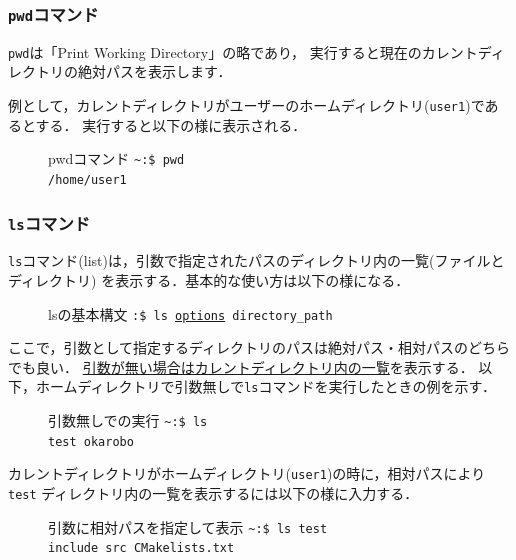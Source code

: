 \documentclass[autodetect-engine,dvi=dvipdfmx,ja=standard,a4j]{bxjsarticle}
\newcommand{\cmd}[1]{\textcolor{yellow!70!white} {#1}}
\newcommand{\dirpath}[1]{\textcolor{Cerulean}{#1}}
\newcommand{\prompt}[1]{\texttt{\dirpath{#1}:\$ }}
\newcommand{\termtext}[2]{\Large{\prompt{#1}\texttt{#2}}}
\begin{document}
\subsubsection{\texttt{pwd}コマンド}
\verb|pwd|は「Print Working Directory」の略であり，
実行すると現在のカレントディレクトリの絶対パスを表示します．

例として，カレントディレクトリがユーザーのホームディレクトリ(\verb|user1|)であるとする．
実行すると以下の様に表示される．

\begin{figure}[H]
    \begin{terminal}{pwdコマンド}
        \termtext{\textasciitilde}{\cmd{pwd}} \\
        \texttt{/home/user1}
    \end{terminal}
\end{figure}


\subsubsection{\texttt{ls}コマンド}
\verb|ls|コマンド(list)は，引数で指定されたパスのディレクトリ内の一覧(ファイルとディレクトリ)
を表示する．基本的な使い方は以下の様になる．

\begin{figure}[H]
    \begin{terminal}{lsの基本構文}
        \termtext{}{\cmd{ls} \underline{options} directory\_path}
    \end{terminal}
\end{figure}

ここで，引数として指定するディレクトリのパスは絶対パス・相対パスのどちらでも良い．
\underline{引数が無い場合はカレントディレクトリ内の一覧}を表示する．
以下，ホームディレクトリで引数無しで\verb|ls|コマンドを実行したときの例を示す．

\begin{figure}[H]
    \begin{terminal}{引数無しでの実行}
        \termtext{\textasciitilde}{\cmd{ls}} \\
        \texttt{\textcolor{dircolor}{test okarobo}}
    \end{terminal}
\end{figure}

カレントディレクトリがホームディレクトリ(\verb|user1|)の時に，相対パスにより\verb|test|
ディレクトリ内の一覧を表示するには以下の様に入力する．

\begin{figure}[H]
    \begin{terminal}{引数に相対パスを指定して表示}
        \termtext{\textasciitilde}{\cmd{ls} test} \\
        \texttt{\textcolor{dircolor}{include src} CMakelists.txt}
    \end{terminal}
\end{figure}
\end{document}
